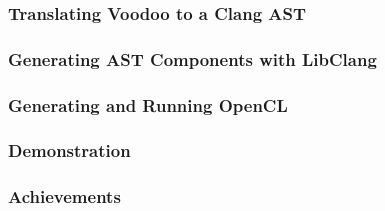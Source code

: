 \documentclass[handout]{beamer}
\begin{document}
\begin{frame}
	\frametitle{Translating Voodoo to a Clang AST}
\end{frame}


\begin{frame}
	\frametitle{Generating AST Components with LibClang}
\end{frame}


\begin{frame}
	\frametitle{Generating and Running OpenCL}
\end{frame}


\begin{frame}
	\frametitle{Demonstration}
\end{frame}


\begin{frame}
	\frametitle{Achievements}
\end{frame}



			



\end{document}
